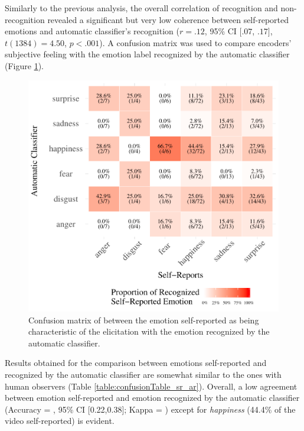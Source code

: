 \documentclass[conference,final,]{IEEEtran}
\makeatletter
\def\maxwidth{\ifdim\Gin@nat@width>\linewidth\linewidth
\else\Gin@nat@width\fi}
\let\Oldincludegraphics\includegraphics
\renewcommand{\includegraphics}[1]{\Oldincludegraphics[width=\maxwidth]{#1}}
\makeatother
\begin{document}
Similarly to the previous analysis, the overall correlation of
recognition and non-recognition revealed a significant but very low
coherence between self-reported emotions and automatic
\nolinebreak classifier's recognition (\(r = .12\), 95\% CI \([.07\),
\(.17]\), \(t(1384) = 4.50\), \(p < .001\)). A confusion matrix was used
to compare encoders' subjective feeling with the emotion label
recognized by the automatic classifier (Figure
\ref{fig:confusionMatrix_sr_ar}).

\begin{figure}
\centering
\includegraphics{ACII_2019_paper_files/figure-latex/confusionMatrix_sr_ar-1.pdf}
\caption{\label{fig:confusionMatrix_sr_ar}Confusion matrix of between
the emotion self-reported as being characteristic of the elicitation
with the emotion recognized by the automatic classifier.}
\end{figure}

Results obtained for the comparison between emotions self-reported and
recognized by the automatic classifier are somewhat similar to the ones
with human observers (Table
\nolinebreak \ref{table:confusionTable_sr_ar}). Overall, a low agreement
between emotion self-reported and emotion recognized by the automatic
classifier (Accuracy \nolinebreak = , 95\% CI
{[}0.22,0.38{]}; Kappa \nolinebreak = ) except for
\emph{happiness} (44.4\% of the video self-reported) is evident.
\end{document}
